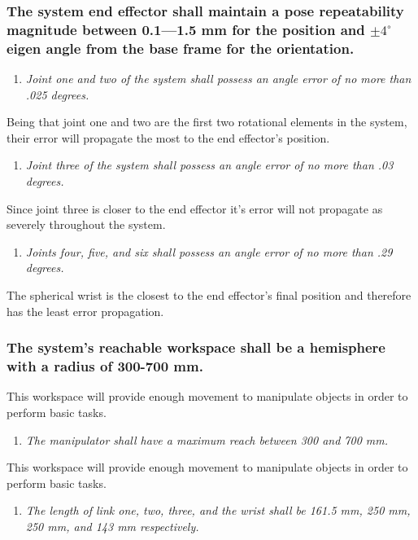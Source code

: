 \subsubsection{The system end effector shall maintain a pose repeatability magnitude between 0.1—1.5 mm for the position and \(\pm 4^{\circ}\) eigen angle from the base frame for the orientation.}
\begin{enumerate}
  \item \textit{Joint one and two of the system shall possess an angle error of no more than .025 degrees.}
\end{enumerate}
Being that joint one and two are the first two rotational elements in the system, their error will propagate the most to the end effector's position.
\begin{enumerate}[resume]
  \item \textit{Joint three of the system shall possess an angle error of no more than .03 degrees.}
\end{enumerate}
Since joint three is closer to the end effector it's error will not propagate as severely throughout the system.
\begin{enumerate}[resume]
  \item \textit{Joints four, five, and six shall possess an angle error of no more than .29 degrees.}
\end{enumerate}
The spherical wrist is the closest to the end effector's final position and therefore has the least error propagation.

\subsubsection{The system’s reachable workspace shall be a hemisphere with a radius of 300-700 mm.}
This workspace will provide enough movement to manipulate objects in order to perform basic tasks.
\begin{enumerate}
  \item \textit{The manipulator shall have a maximum reach between 300 and 700 mm.}
\end{enumerate}
This workspace will provide enough movement to manipulate objects in order to perform basic tasks.
\begin{enumerate}[resume]
  \item \textit{The length of link one, two, three, and the wrist shall be 161.5 mm, 250 mm, 250 mm, and 143 mm respectively.}
\end{enumerate}
